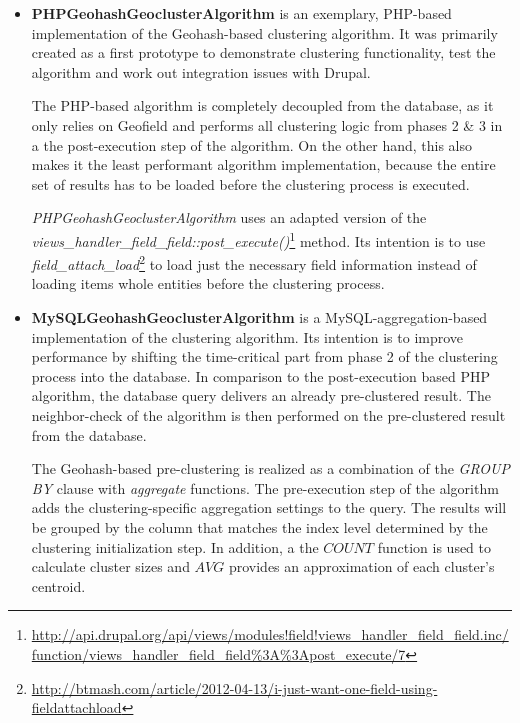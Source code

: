\begin{itemize}

\item \textbf{PHPGeohashGeoclusterAlgorithm} is an exemplary, PHP-based implementation of the Geohash-based clustering algorithm. It was primarily created as a first prototype to demonstrate clustering functionality, test the algorithm and work out integration issues with Drupal.

The PHP-based algorithm is completely decoupled from the database, as it only relies on Geofield and performs all clustering logic from phases 2 \& 3 in a the post-execution step of the algorithm. On the other hand, this also makes it the least performant algorithm implementation, because the entire set of results has to be loaded before the clustering process is executed.

\textit{PHPGeohashGeoclusterAlgorithm} uses an adapted version of the \\ \textit{views\_handler\_field\_field::post\_execute()}\footnote{\url{http://api.drupal.org/api/views/modules!field!views\_handler\_field\_field.inc/function/views\_handler\_field\_field\%3A\%3Apost\_execute/7}} method. Its intention is to use\\ \textit{field\_attach\_load}\footnote{\url{http://btmash.com/article/2012-04-13/i-just-want-one-field-using-fieldattachload}} to load just the necessary field information instead of loading items whole entities before the clustering process.


\item \textbf{MySQLGeohashGeoclusterAlgorithm} is a MySQL-aggregation-based implementation of the clustering algorithm. Its intention is to improve performance by shifting the time-critical part from phase 2 of the clustering process into the database. In comparison to the post-execution based PHP algorithm, the database query delivers an already pre-clustered result. The neighbor-check of the algorithm is then performed on the pre-clustered result from the database.

The Geohash-based pre-clustering is realized as a combination of the \textit{GROUP BY} clause with \textit{aggregate} functions. The pre-execution step of the algorithm adds the clustering-specific aggregation settings to the query. The results will be grouped by the column that matches the index level determined by the clustering initialization step. In addition, a the $COUNT$ function is used to calculate cluster sizes and $AVG$ provides an approximation of each cluster's centroid.


\end{itemize}
